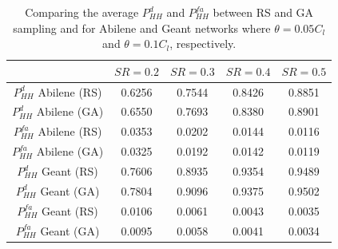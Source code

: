 \begin{table}
	\centering
 \small{
 \renewcommand{\tabcolsep}{0.05cm}
 \renewcommand{\arraystretch}{1.0}
		\begin{tabular}{| c | c | c | c | c |}
		\hline
                                   & $SR=0.2$ & $SR=0.3$ & $SR=0.4$ & $SR=0.5$   \\ \hline
      $P^{d}_{HH}$ Abilene  (RS)   & 0.6256 & 0.7544 & 0.8426 & 0.8851 \\ \hline
      $P^{d}_{HH}$ Abilene  (GA)   & 0.6550 & 0.7693 & 0.8380 & 0.8901 \\ \hline
      $P^{fa}_{HH}$ Abilene   (RS) & 0.0353 & 0.0202 & 0.0144 & 0.0116 \\ \hline
      $P^{fa}_{HH}$ Abilene   (GA) & 0.0325 & 0.0192 & 0.0142 & 0.0119 \\ \hline
      $P^{d}_{HH}$ Geant   (RS)    & 0.7606 & 0.8935 & 0.9354 & 0.9489 \\ \hline
      $P^{d}_{HH}$ Geant   (GA)    & 0.7804 & 0.9096 & 0.9375 & 0.9502 \\ \hline
      $P^{fa}_{HH}$ Geant  (RS)    & 0.0106 & 0.0061 & 0.0043 & 0.0035 \\ \hline
      $P^{fa}_{HH}$ Geant  (GA)    & 0.0095 & 0.0058 & 0.0041 & 0.0034 \\ \hline
    \end{tabular}
  	\caption{{Comparing the average $P^{d}_{HH}$ and $P^{fa}_{HH}$ between RS and GA sampling and for Abilene and Geant networks where $\theta=0.05 C_{l}$ and $\theta=0.1 C_{l}$, respectively.}}
	\label{tab:SNIPERPdPfaHH}
}
\end{table}
